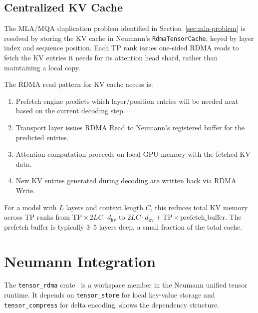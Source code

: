 \documentclass[11pt,letterpaper]{article}
\theoremstyle{definition}
\begin{document}
\subsection{Centralized KV Cache}

The MLA/MQA duplication problem identified in Section~\ref{sec:mla-problem} is resolved by storing the KV cache in Neumann's \texttt{RdmaTensorCache}, keyed by layer index and sequence position. Each TP rank issues one-sided RDMA reads to fetch the KV entries it needs for its attention head shard, rather than maintaining a local copy.

The RDMA read pattern for KV cache access is:
\begin{enumerate}
    \item Prefetch engine predicts which layer/position entries will be needed next based on the current decoding step.
    \item Transport layer issues RDMA Read to Neumann's registered buffer for the predicted entries.
    \item Attention computation proceeds on local GPU memory with the fetched KV data.
    \item New KV entries generated during decoding are written back via RDMA Write.
\end{enumerate}

For a model with $L$ layers and context length $C$, this reduces total KV memory across TP ranks from $\text{TP} \times 2LC \cdot d_{\text{kv}}$ to $2LC \cdot d_{\text{kv}} + \text{TP} \times \text{prefetch\_buffer}$. The prefetch buffer is typically 3--5 layers deep, a small fraction of the total cache.

\section{Neumann Integration}
\label{sec:neumann-integration}

The \texttt{tensor\_rdma} crate~\cite{neumann-repo} is a workspace member in the Neumann unified tensor runtime. It depends on \texttt{tensor\_store} for local key-value storage and \texttt{tensor\_compress} for delta encoding.  shows the dependency structure.
\end{document}
